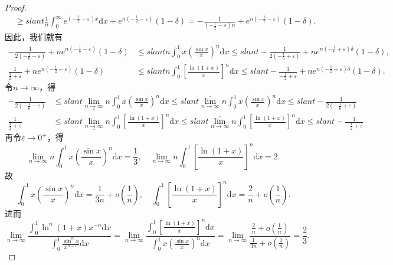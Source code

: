 \documentclass[../../main.tex]{subfiles}
\begin{document}
\begin{proof}
\begin{align*}
&\geqslant slant \frac{1}{n}\int_0^{\infty}{e^{\left( -\frac{1}{2}-\varepsilon \right) x}\mathrm{d}x}+e^{n\left( -\frac{1}{2}-\varepsilon \right)}\left( 1-\delta \right) =-\frac{1}{\left( -\frac{1}{2}-\varepsilon \right) n}+e^{n\left( -\frac{1}{2}-\varepsilon \right)}\left( 1-\delta \right) .
\end{align*}
因此，我们就有
\begin{align*}
-\frac{1}{2\left( -\frac{1}{6}-\varepsilon \right)}+ne^{n\left( -\frac{1}{6}-\varepsilon \right)}\left( 1-\delta \right) &\leqslant slant n\int_0^1{x\left( \frac{\sin x}{x} \right) ^n\mathrm{d}x}\leqslant slant -\frac{1}{2\left( -\frac{1}{6}+\varepsilon \right)}+ne^{n\left( -\frac{1}{6}+\varepsilon \right) \delta}\left( 1-\delta \right) ,\\
\frac{1}{\frac{1}{2}+\varepsilon}+ne^{n\left( -\frac{1}{2}-\varepsilon \right)}\left( 1-\delta \right) &\leqslant slant n\int_0^1{\left[ \frac{\ln \left( 1+x \right)}{x} \right] ^n\mathrm{d}x}\leqslant slant -\frac{1}{-\frac{1}{2}+\varepsilon}+ne^{n\left( -\frac{1}{2}+\varepsilon \right) \delta}\left( 1-\delta \right) .
\end{align*}
令$n\rightarrow \infty$，得
\begin{align*}
-\frac{1}{2\left( -\frac{1}{6}-\varepsilon \right)}&\leqslant slant \underline{\lim\limits_{n\rightarrow \infty}}n\int_0^1{x\left( \frac{\sin x}{x} \right) ^n\mathrm{d}x}\leqslant slant \overline{\lim\limits_{n\rightarrow \infty}}n\int_0^1{x\left( \frac{\sin x}{x} \right) ^n\mathrm{d}x}\leqslant slant -\frac{1}{2\left( -\frac{1}{6}+\varepsilon \right)}\\
\frac{1}{\frac{1}{2}+\varepsilon}&\leqslant slant \underline{\lim\limits_{n\rightarrow \infty}}n\int_0^1{\left[ \frac{\ln \left( 1+x \right)}{x} \right] ^n\mathrm{d}x}\leqslant slant \overline{\lim\limits_{n\rightarrow \infty}}n\int_0^1{\left[ \frac{\ln \left( 1+x \right)}{x} \right] ^n\mathrm{d}x}\leqslant slant -\frac{1}{-\frac{1}{2}+\varepsilon}
\end{align*}
再令$\varepsilon \rightarrow 0^+$，得
\[
\lim\limits_{n\rightarrow \infty}n\int_0^1{x\left( \frac{\sin x}{x} \right) ^n\mathrm{d}x}=\frac{1}{3},\quad \lim\limits_{n\rightarrow \infty}n\int_0^1{\left[ \frac{\ln \left( 1+x \right)}{x} \right] ^n\mathrm{d}x}=2.
\]
故
\[
\int_0^1{x\left( \frac{\sin x}{x} \right) ^n\mathrm{d}x}=\frac{1}{3n}+o\left( \frac{1}{n} \right) ,\quad \int_0^1{\left[ \frac{\ln \left( 1+x \right)}{x} \right] ^n\mathrm{d}x}=\frac{2}{n}+o\left( \frac{1}{n} \right) .
\]
进而
\[
\lim\limits_{n\rightarrow \infty}\frac{\int_0^1{\ln ^n(1 + x)x^{-n}\mathrm{d}x}}{\int_0^1{\frac{\sin ^nx}{x^{n-1}}\mathrm{d}x}}=\lim\limits_{n\rightarrow \infty}\frac{\int_0^1{\left[ \frac{\ln \left( 1+x \right)}{x} \right] ^n\mathrm{d}x}}{\int_0^1{x\left( \frac{\sin x}{x} \right) ^n\mathrm{d}x}}=\lim\limits_{n\rightarrow \infty}\frac{\frac{2}{n}+o\left( \frac{1}{n} \right)}{\frac{1}{3n}+o\left( \frac{1}{n} \right)}=\frac{2}{3}.
\]
\end{proof}
\end{document}
